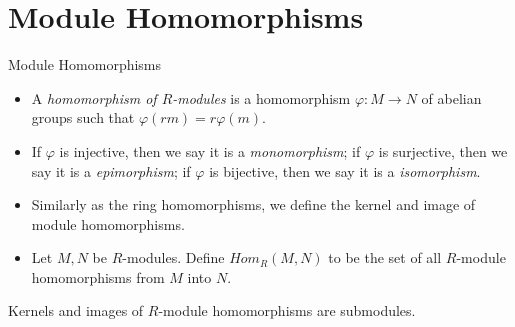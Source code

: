 \section{Module Homomorphisms}


\begin{definition}{Module Homomorphisms}
\begin{itemize}
    \item A \textit{homomorphism of $R$-modules} is a homomorphism $\varphi:M \to N$ of abelian groups such that $\varphi (rm) =r\varphi(m)$.
    \item If $\varphi$ is injective, then we say it is a \textit{monomorphism}; if $\varphi$ is surjective, then we say it is a \textit{epimorphism}; if $\varphi$ is bijective, then we say it is a \textit{isomorphism}.

    \item Similarly as the ring homomorphisms, we define the kernel and image of module homomorphisms.

    \item Let $M,N$ be $R$-modules. Define $Hom_R(M,N)$ to be the set of all $R$-module homomorphisms from $M$ into $N$.
\end{itemize}
\end{definition}

\begin{proposition}
    Kernels and images of $R$-module homomorphisms are submodules.
\end{proposition}

